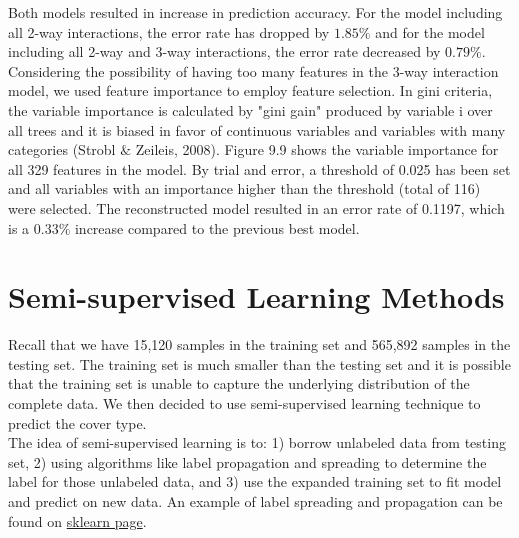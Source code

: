 \documentclass[11pt]{article}
\begin{document}
\noindent Both models resulted in increase in prediction accuracy. For the model including all 2-way interactions, the error rate has dropped by $1.85\%$ and for the model including all 2-way and 3-way interactions, the error rate decreased by $0.79\%$.\\

\noindent Considering the possibility of having too many features in the 3-way interaction model, we used feature importance to employ feature selection. In gini criteria, the variable importance is calculated by "gini gain" produced by variable i over all trees and it is biased in favor of continuous variables and variables with many categories (Strobl $\&$ Zeileis, 2008). Figure 9.9 shows the variable importance for all 329 features in the model. By trial and error, a threshold of 0.025 has been set and all variables with an importance higher than the threshold (total of 116) were selected. The reconstructed model resulted in an error rate of 0.1197, which is a $0.33\%$ increase compared to the previous best model.


\section{Semi-supervised Learning Methods}
Recall that we have 15,120 samples in the training set and 565,892 samples in the testing set. The training set is much smaller than the testing set and it is possible that the training set is unable to capture the underlying distribution of the complete data. We then decided to use semi-supervised learning technique to predict the cover type.\\

\noindent The idea of semi-supervised learning is to: 1) borrow unlabeled data from testing set, 2) using algorithms like label propagation and spreading to determine the label for those unlabeled data, and 3) use the expanded training set to fit model and predict on new data. An example of label spreading and propagation can be found on \href{http://scikit-learn.org/stable/modules/label_propagation.html}{sklearn page}.\\


\end{document}
